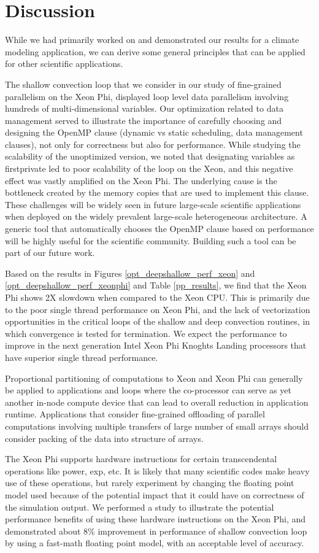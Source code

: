 \section{Discussion}
\label{discussion}

While we had primarily worked on and demonstrated our results for a climate modeling application, we can derive some general principles that can be applied for other scientific applications.

The shallow convection loop that we consider in our study of fine-grained parallelism on the Xeon Phi, displayed loop level data parallelism involving hundreds of multi-dimensional variables. Our optimization related to data management served to illustrate the importance of carefully choosing and designing the OpenMP clause (dynamic vs static scheduling, data management clauses), not only for correctness but also for performance. While studying the scalability of the unoptimized version, we noted that designating variables as firstprivate led to poor scalability of the loop on the Xeon, and this negative effect was vastly amplified on the Xeon Phi. The underlying cause is the bottleneck created by the memory copies that are used to implement this clause. These challenges will be widely seen in future large-scale scientific applications when deployed on the widely prevalent large-scale heterogeneous architecture. A generic tool that automatically chooses the OpenMP clause based on performance will be highly useful for the scientific community. Building such a tool can be part of our future work.

Based on the results in Figures \ref{opt_deepshallow_perf_xeon} and \ref{opt_deepshallow_perf_xeonphi} and Table \ref{pp_results}, we find that the Xeon Phi shows 2X slowdown when compared to the Xeon CPU. This is primarily due to the poor single thread performance on Xeon Phi, and the lack of vectorization opportunities in the critical loops of the shallow and deep convection routines, in which convergence is tested for termination. We expect the performance to improve in the next generation Intel Xeon Phi Knoghts Landing processors that have superior single thread performance.

Proportional partitioning of computations to Xeon and Xeon Phi can generally be applied to applications and loops where the co-processor can serve as yet another in-node compute device that can lead to overall reduction in application runtime. Applications that consider fine-grained offloading of parallel computations involving multiple transfers of large number of small arrays should consider packing of the data into structure of arrays.

The Xeon Phi supports hardware instructions for certain transcendental operations like power, exp, etc. It is likely that many scientific codes make heavy use of these operations, but rarely experiment by changing the floating point model used because of the potential impact that it could have on correctness of the simulation output. We performed a study to illustrate the potential performance benefits of using these hardware instructions on the Xeon Phi, and demonstrated about 8\% improvement in performance of shallow convection loop by using a fast-math floating point model, with an acceptable level of accuracy.
